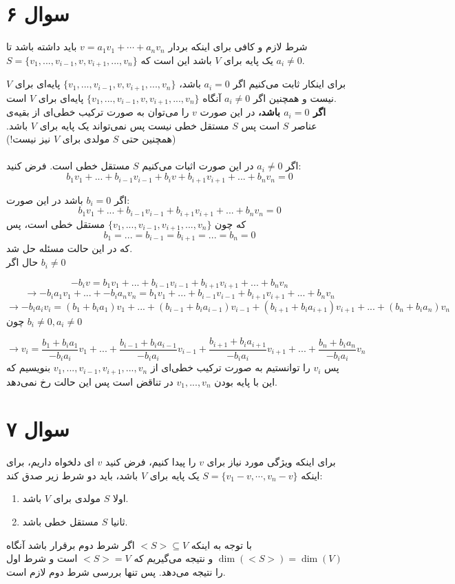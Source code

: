 \documentclass[12pt,a4paper]{article}
\begin{document}
\section{سوال ۶}
شرط لازم و کافی برای اینکه بردار 
$v = a_1 v_1 + \cdots + a_n v_n$
باید داشته باشد تا 
\\
$S = \{v_1, ..., v_{i-1}, v, v_{i+1}, ..., v_n\}$
یک پایه برای $V$ باشد این است که 
$a_i \neq 0$.

برای اینکار ثابت می‌کنیم اگر $a_i = 0$ باشد، $\{v_1, ..., v_{i-1}, v, v_{i+1}, ..., v_n\}$ پایه‌ای برای $V$ نیست و همچنین اگر 
$a_i \neq 0$
آنگاه 
$\{v_1, ..., v_{i-1}, v, v_{i+1}, ..., v_n\}$
پایه‌ای برای $V$ است.
\\
\textbf{اگر $a_i = 0$ باشد،}
در این صورت $v$ را می‌توان به صورت ترکیب خطی‌ای از بقیه‌ی عناصر $S$ است پس $S$ مستقل خطی نیست پس نمی‌تواند یک پایه برای $V$ باشد. (همچنین حتی $S$ مولدی برای $V$ نیز نیست!)
\\
\\
اگر 
$a_i \neq 0$
در این صورت اثبات می‌کنیم $S$ مستقل خطی است. فرض کنید:
\[
b_1 v_1 + ... + b_{i-1} v_{i-1} + b_i v + b_{i+1} v_{i+1} + ... + b_n v_n = 0
\]

اگر $b_i = 0$ باشد در این صورت:
\[
b_1 v_1 + ... + b_{i-1} v_{i-1} + b_{i+1} v_{i+1} + ... + b_n v_n = 0
\]
که چون 
$\{v_1, ..., v_{i-1}, v_{i+1}, ..., v_n\}$
مستقل خطی است، پس 
\[
b_1 = ... = b_{i-1} = b_{i+1} = ... = b_n = 0
\]
که در این حالت مسئله حل شد.
\\
حال اگر 
$b_i \neq 0$

\[
-b_i v =  b_1 v_1 + ... + b_{i-1} v_{i-1} + b_{i+1} v_{i+1} + ... + b_n v_n
\]
\[
\rightarrow 
- b_i a_1 v_1 + ... + - b_i a_n v_n = b_1 v_1 + ... + b_{i-1} v_{i-1} + b_{i+1} v_{i+1} + ... + b_n v_n
\]
\[
\rightarrow 
- b_i a_i v_i = (b_1 + b_i a_1) v_1 + ... + (b_{i-1} + b_i a_{i-1}) v_{i-1} + (b_{i+1} + b_i a_{i+1}) v_{i+1} + ... + (b_n + b_i a_n) v_n
\]
چون 
$b_i \neq 0 , a_i \neq 0$

\[
\rightarrow 
 v_i = \frac{b_1 + b_i a_1}{- b_i a_i} v_1 + ... + \frac{b_{i-1} + b_i a_{i-1}}{- b_i a_i} v_{i-1} + \frac{b_{i+1} + b_i a_{i+1}}{- b_i a_i} v_{i+1} + ... + \frac{b_n + b_i a_n}{- b_i a_i} v_n
\]
پس $v_i$ را توانستیم به صورت ترکیب خطی‌ای از 
$v_1, ..., v_{i-1}, v_{i+1}, ..., v_n$
بنویسیم که این با پایه بودن
$v_1, ..., v_n$
در تناقض است پس این حالت رخ نمی‌دهد.
\section{سوال ۷}
برای اینکه ویژگی مورد نیاز برای $v$ را پیدا کنیم، فرض کنید $v$ ای دلخواه داریم، برای اینکه 
$S = \{v_1 - v, \cdots, v_n-v \}$
یک پایه برای $V$ باشد، باید دو شرط زیر صدق کند:
\begin{enumerate}
	\item 
	اولا $S$ مولدی برای $V$ باشد.
	\item
	ثانیا $S$ مستقل خطی باشد.
\end{enumerate}
با توجه به اینکه 
$<S> \subseteq V$
اگر شرط دوم برقرار باشد آنگاه 
$\dim(<S>) = \dim(V)$
و نتیجه می‌گیریم که 
$<S> = V$
است و شرط اول را نتیجه می‌دهد. پس تنها بررسی شرط دوم لازم است.
\end{document}
